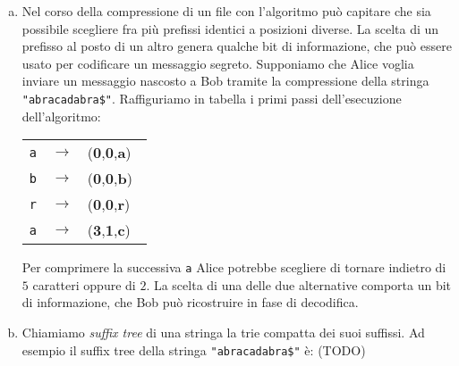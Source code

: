 \begin{enumerate}[(a)]
  \item Nel corso della compressione di un file con l'algoritmo \LZuno pu\`o
  capitare che sia possibile scegliere fra pi\`u prefissi identici a posizioni
  diverse. La scelta di un prefisso al posto di un altro genera qualche bit
  di informazione, che pu\`o essere usato per codificare un messaggio segreto.
  Supponiamo che Alice voglia inviare un messaggio nascosto a Bob tramite la
  compressione della stringa \texttt{\string"abracadabra\$\string"}.
  Raffiguriamo in tabella i primi passi dell'esecuzione dell'algoritmo:
  \begin{table}[H]
    \centering
    \begin{tabularx}{5cm}{*{3}{X}}
      \texttt{a} & \(\rightarrow\) & (\textbf{0},\textbf{0},\textbf{a})\ \\
      \texttt{b} & \(\rightarrow\) & (\textbf{0},\textbf{0},\textbf{b})\ \\
      \texttt{r} & \(\rightarrow\) & (\textbf{0},\textbf{0},\textbf{r})\ \\
      \texttt{a} & \(\rightarrow\) & (\textbf{3},\textbf{1},\textbf{c})\ \\
    \end{tabularx}
  \end{table}
  
  Per comprimere la successiva \texttt{a} Alice potrebbe scegliere di tornare
  indietro di \(5\) caratteri oppure di \(2\). La scelta di una delle due
  alternative comporta un bit di informazione, che Bob pu\`o ricostruire in
  fase di decodifica.

  \item Chiamiamo \emph{suffix tree} di una stringa la trie compatta dei suoi
  suffissi. Ad esempio il suffix tree della stringa 
  \texttt{\string"abracadabra\$\string"} \`e: (TODO)
  \begin{figure}[H]
    \centering
\end{figure}
\end{enumerate}
